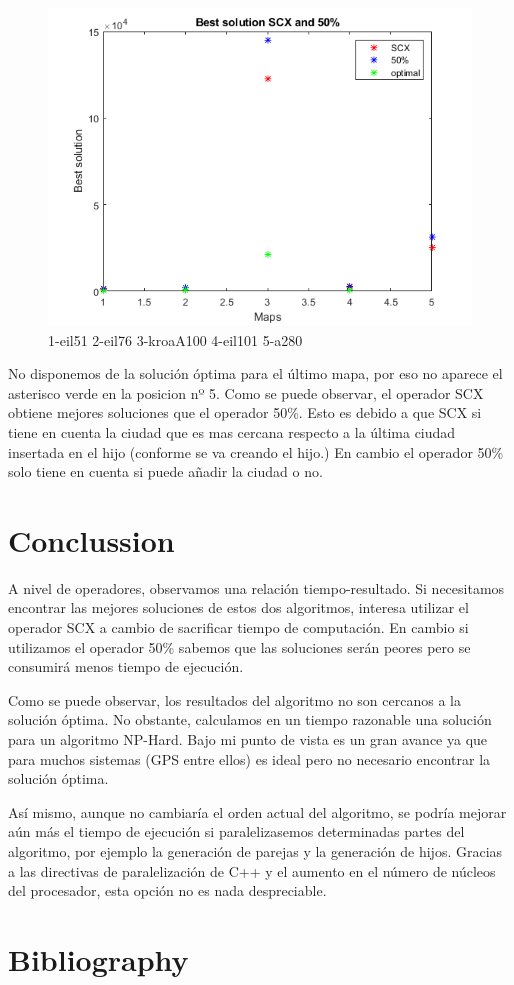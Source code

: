 \documentclass{article}
\begin{document}
\begin{figure}[H]
    \centering
    \includegraphics[width=1\textwidth]{solutions.png}
    \caption{1-eil51 2-eil76 3-kroaA100 4-eil101 5-a280}
\end{figure}
No disponemos de la solución óptima para el último mapa, por eso no aparece el asterisco verde en la 
posicion nº 5. 
Como se puede observar, el operador SCX obtiene mejores soluciones que el operador 50\%. Esto es debido 
a que SCX si tiene en cuenta la ciudad que es mas cercana respecto a la última ciudad insertada en 
el hijo (conforme se va creando el hijo.) En cambio el operador 50\% solo tiene en cuenta si puede añadir
la ciudad o no. 

\section{Conclussion}
    A nivel de operadores, observamos una relación tiempo-resultado. Si necesitamos encontrar 
    las mejores soluciones de estos dos algoritmos, interesa utilizar el operador SCX a cambio de sacrificar
    tiempo de computación. En cambio si utilizamos el operador 50\% sabemos que las soluciones serán 
    peores pero se consumirá menos tiempo de ejecución. 

    Como se puede observar, los resultados del algoritmo no son cercanos a la solución óptima. No obstante, calculamos en un tiempo razonable 
    una solución para un algoritmo NP-Hard. Bajo mi punto de vista es un gran avance ya que para muchos sistemas (GPS entre ellos) es ideal 
    pero no necesario encontrar la solución óptima.
    
    Así mismo, aunque no cambiaría el orden actual del algoritmo, se podría mejorar aún más el tiempo 
    de ejecución si paralelizasemos determinadas partes del algoritmo, por ejemplo la generación de parejas y la generación de hijos. Gracias 
    a las directivas de paralelización de C++ y el aumento en el número de núcleos del procesador, esta opción no es nada despreciable. 
\section{Bibliography}
\end{document}
